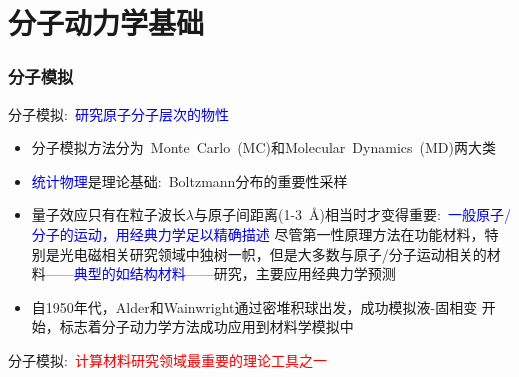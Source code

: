 \small
\section{分子动力学基础}
\frame
{
	\frametitle{分子模拟}
	分子模拟:~\textcolor{blue}{研究原子分子层次的物性}
	\begin{itemize}
		\item 分子模拟方法分为~\textrm{Monte~Carlo~(MC)}和\textrm{Molecular~Dynamics~(MD)}两大类
		\item \textcolor{blue}{统计物理}是理论基础:~\textrm{Boltzmann}分布的重要性采样
	\end{itemize}
	\begin{itemize}
		\item 量子效应只有在粒子波长$\lambda$与原子间距离\textrm{(1-3~\AA)}相当时才变得重要:~\textcolor{blue}{一般原子/分子的运动，用经典力学足以精确描述}
			\vskip 2pt
			尽管第一性原理方法在功能材料，特别是光电磁相关研究领域中独树一帜，但是大多数与原子/分子运动相关的材料——\textcolor{blue}{典型的如结构材料}——研究，主要应用经典力学预测%
		\item 自\textrm{1950}年代，\textrm{Alder}和\textrm{Wainwright}通过密堆积球出发，成功模拟液-固相变%
			开始，标志着分子动力学方法成功应用到材料学模拟中
	\end{itemize}
	分子模拟:~\textcolor{red}{计算材料研究领域最重要的理论工具之一}
}

